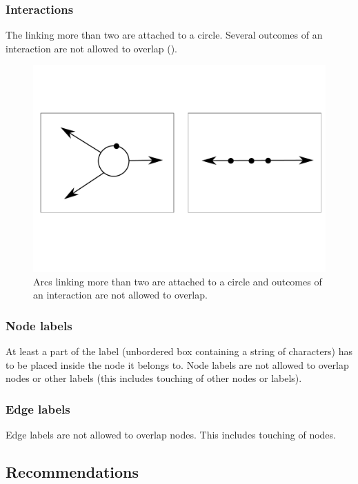 \subsubsection{Interactions}

The  linking more than two  are attached to a circle. Several outcomes of an interaction are not allowed to overlap ().

\begin{figure}[h!]
  \centering
  \includegraphics[scale=0.3]{images/layout-connecting-arcs}
  \caption{Arcs linking more than two  are attached to a circle and outcomes of an interaction are not allowed to overlap.}\label{fig:layout6}
\end{figure}

\subsubsection{Node labels}

At least a part of the label (unbordered box containing a string of characters) has to be placed inside the node it belongs to. Node labels are not allowed to overlap nodes or other labels (this includes touching of other nodes or labels).

\subsubsection{Edge labels}

Edge labels are not allowed to overlap nodes. This includes touching of nodes.

\subsection{Recommendations}

